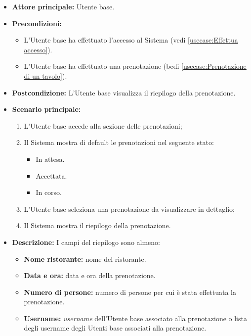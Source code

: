 \label{usecase:Visualizzazione del riepilogo prenotazione}
\begin{itemize}
	\item \textbf{Attore principale:} Utente base.

	\item \textbf{Precondizioni:}
	\begin{itemize}
		\item L'Utente base ha effettuato l'accesso al Sistema (vedi \autoref{usecase:Effettua accesso}).
		\item L'Utente base ha effettuato una prenotazione (bedi \autoref{usecase:Prenotazione di un tavolo}).
	\end{itemize}


	\item \textbf{Postcondizione:}
	      L'Utente base visualizza il riepilogo della prenotazione.

	\item \textbf{Scenario principale:}
	      \begin{enumerate}
		      \item L'Utente base accede alla sezione delle prenotazioni;
		      \item Il Sistema mostra di default le prenotazioni nel seguente stato:
		      \begin{itemize}
                \item In attesa.
                \item Accettata.
                \item In corso.
              \end{itemize}
		      \item L'Utente base seleziona una prenotazione da visualizzare in dettaglio;
		      \item Il Sistema mostra il riepilogo della prenotazione.
	      \end{enumerate}

	\item \textbf{Descrizione:}
	      I campi del riepilogo sono almeno:
	      \begin{itemize}
		      \item \textbf{Nome ristorante:} nome del ristorante.
		      \item \textbf{Data e ora:} data e ora della prenotazione.
		      \item \textbf{Numero di persone:} numero di persone per cui è
		            stata effettuata la prenotazione.
		      \item \textbf{Username:} \textit{username} dell'Utente base
		            associato alla prenotazione o lista degli username degli
		            Utenti base associati alla prenotazione.


\end{itemize}
\end{itemize}

